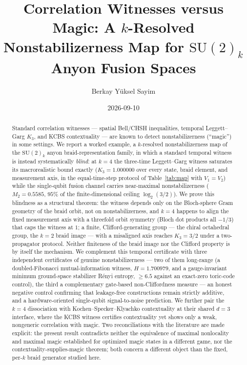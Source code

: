 \documentclass[aps,pra,twocolumn,superscriptaddress,longbibliography,floatfix,nofootinbib]{revtex4-2}
\begin{document}
\setcounter{secnumdepth}{3}

\title{Correlation Witnesses versus Magic: A $k$-Resolved Nonstabilizerness Map for $\mathrm{SU}(2)_k$ Anyon Fusion Spaces}

\author{Berkay Y\"uksel Sayim}

\date{2026-09-10}

\begin{abstract}
Standard correlation witnesses --- spatial Bell/CHSH inequalities,
temporal Leggett--Garg $K_3$, and KCBS contextuality --- are known to
detect nonstabilizerness (``magic'') in some settings. We report a
worked example, a $k$-resolved nonstabilizerness map of the
$\mathrm{SU}(2)_k$ anyon braid-representation family, in which a
standard temporal witness is instead systematically \emph{blind}: at
$k=4$ the three-time Leggett--Garg witness saturates its
macrorealistic bound exactly ($K_3=1.000000$ over every state, braid
element, and measurement axis, in the equal-time-step protocol of
Table~\ref{tab:map} with $V_1{=}V_2$) while the single-qubit fusion channel
carries near-maximal nonstabilizerness ($M_2=0.5585$, $95\%$ of the
finite-dimensional ceiling $\log_2(3/2)$). We prove this blindness as
a structural theorem: the witness depends only on the Bloch-sphere
Gram geometry of the braid orbit, not on nonstabilizerness, and $k=4$
happens to align the fixed measurement axis with a threefold orbit
symmetry (Bloch dot products all $-1/3$) that caps the witness at
$1$; a finite, Clifford-generating group --- the chiral octahedral
group, the $k{=}2$ braid image --- with a misaligned axis reaches
$K_3=3/2$ under a two-propagator protocol. Neither finiteness of the braid image nor the
Clifford property is by itself the mechanism. We complement this
temporal certificate with three independent certificates of genuine
nonstabilizerness --- two of them long-range (a doubled-Fibonacci
mutual-information witness, $H=1.700979$, and a gauge-invariant minimum
ground-space stabilizer Rényi entropy, $\geq6.5$ against an exact-zero
toric-code control), the third a complementary gate-based
non-Cliffordness measure --- an honest negative
control confirming that leakage-free constructions remain strictly
additive, and a hardware-oriented single-qubit signal-to-noise
prediction. We further pair the $k=4$ dissociation with Kochen--Specker--Klyachko
contextuality at their shared $d=3$ interface, where the KCBS witness certifies
contextuality yet shows only a weak, nongeneric correlation with magic. Two reconciliations with the literature are made explicit: the present result contradicts
neither the equivalence of maximal nonlocality and maximal magic established for optimized magic
states in a different game, nor the contextuality-supplies-magic theorem; both concern a
different object than the fixed, per-$k$ braid generator studied here.
\end{abstract}
\end{document}
